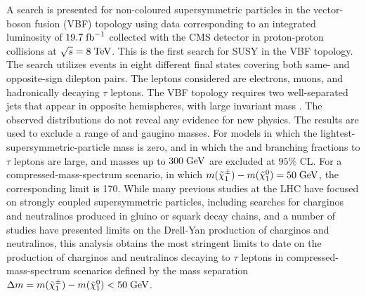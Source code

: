 


A search is presented for non-coloured supersymmetric particles in the vector-boson fusion (VBF) topology using data corresponding to an integrated luminosity of $19.7\;\text{fb}^{-1}$ collected with the CMS detector in proton-proton collisions at $\sqrt{s} = 8\;\text{Te}\kern-0.06667em\text{V}$. This is the first search for SUSY in the VBF topology. The search utilizes events in eight different final states covering both same- and opposite-sign dilepton pairs. The leptons considered are electrons, muons, and hadronically decaying $\tau$ leptons. The VBF topology requires two well-separated jets that appear in opposite hemispheres, with large invariant mass \mjj. The observed \mjj distributions do not reveal any evidence for new physics. The results are used to exclude a range of \charginopm and \neutralinotwo gaugino masses. For models in which the \neutralinoone lightest-supersymmetric-particle mass is zero, and in which the \charginopm and \neutralinotwo branching fractions to $\tau$ leptons are large, \charginopm and \neutralinotwo masses up to $300\;\text{Ge}\kern-0.06667em\text{V}$ are excluded at $95\%$ CL. For a compressed-mass-spectrum scenario, in which $m(\tilde{\chi}^{\pm}_{1}) - m(\tilde{\chi}^{0}_{1}) = 50\;\text{Ge}\kern-0.06667em\text{V}$, the corresponding limit is 170\gev. While many previous studies at the LHC have focused on strongly coupled supersymmetric particles, including searches for charginos and neutralinos produced in gluino or squark decay chains, and a number of studies have presented limits on the Drell-Yan production of charginos and neutralinos, this analysis obtains the most stringent limits to date on the production of charginos and neutralinos decaying to $\tau$ leptons in compressed-mass-spectrum scenarios defined by the mass separation $\Delta m = m(\tilde{\chi}^{\pm}_{1}) - m(\tilde{\chi}^{0}_{1}) < 50\;\text{Ge}\kern-0.06667em\text{V}$.